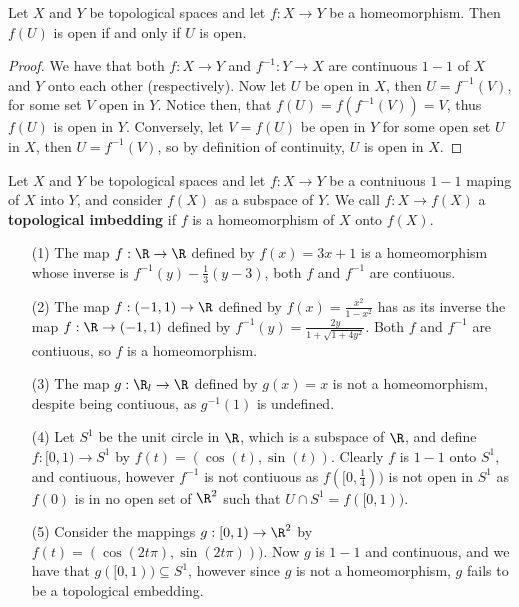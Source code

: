 \begin{lemma}\label{1.7.2}
    Let $X$ and  $Y$ be topological spaces and let $f:X \rightarrow Y$ be a homeomorphism. Then
    $f(U)$ is open if and only if $U$ is open.
\end{lemma}
\begin{proof}
    We have that both $f:X \rightarrow Y$ and  $f^{-1}:Y \rightarrow X$ are continuous $1-1$ of $X$
    and  $Y$ onto each other  (respectively). Now let $U$ be open in  $X$, then $U=f^{-1}(V)$, for
    some set  $V$ open in $Y$. Notice then, that $f(U)=f(f^{-1}(V))=V$, thus $f(U)$ is open in $Y$.
    Conversely, let $V=f(U)$ be open in $Y$ for some open set  $U$ in  $X$, then  $U=f^{-1}(V)$, so
    by definition of continuity, $U$  is open in $X$.
\end{proof}

\begin{definition}
    Let $X$ and  $Y$ be topological spaces and let  $f:X \rightarrow Y$ be a
    contniuous  $1-1$ maping
    of  $X$ into  $Y$, and consider  $f(X)$ as a subspace of $Y$. We call  $f:X \rightarrow f(X)$ a
    \textbf{topological imbedding} if $f$ is a homeomorphism of $X$ onto  $f(X)$.
\end{definition}

\begin{example}
    \begin{enumerate}
        \item[(1)] The map $f:\R \rightarrow \R$ defined by  $f(x)=3x+1$ is a homeomorphism whose inverse
            is $f^{-1}(y)-\frac{1}{3}(y-3)$, both $f$ and  $f^{-1}$ are contiuous.

        \item[(2)] The map $f:(-1,1) \rightarrow \R$ defined by $f(x)=\frac{x^2}{1-x^2}$ has as its
            inverse the map $f:\R \rightarrow (-1,1)$ defined by
            $f^{-1}(y)=\frac{2y}{1+\sqrt{1+4y^2}}$. Both $f$ and  $f^{-1}$ are contiuous, so $f$ is
            a homeomorphism.

        \item[(3)] The map  $g:\R_l \rightarrow \R$ defined by  $g(x)=x$ is not a homeomorphism, despite
            being contiuous, as $g^{-1}(1)$ is undefined.

        \item[(4)] Let $S^1$ be the unit circle in $\R$, which is a subspace of $\R$, and define
            $f:[0,1) \rightarrow S^1$ by $f(t)=(\cos(t),\sin(t))$. Clearly $f$ is  $1-1$ onto
            $S^1$, and contiuous, however  $f^{-1}$ is not contiuous as $f([0,\frac{1}{4}))$ is not
            open in $S^1$ as  $f(0)$ is in no open set of $\R^2$ such that  $U \cap S^1=f([0,1))$.

        \item[(5)] Consider the mappings $g:[0,1) \rightarrow \R^2$ by $f(t)=(\cos(2t\pi),\sin(2t\pi)))$.
            Now $g$ is  $1-1$ and continuous, and we have that  $g([0,1)) \subseteq S^1$, however
            since $g$ is not a homeomorphism,  $g$ fails to be a topological embedding.
    \end{enumerate}
\end{example}

